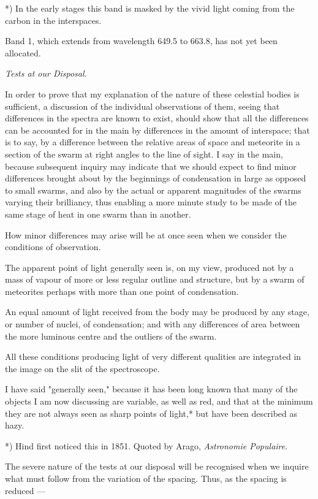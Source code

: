 \documentclass[a4paper, 12pt, oneside, polutonikogreek, english]{article}
\begin{document}
*) In the early stages this band is masked by the vivid light coming from the carbon in the interspaces.

Band 1, which extends from wavelength 649.5 to 663.8, has not yet been allocated.

\emph{Tests at our Disposal.}

In order to prove that my explanation of the nature of these celestial bodies is sufficient, a discussion of the individual observations of them, seeing that differences in the spectra are known to exist, should show that all the differences can be accounted for in the main by differences in the amount of interspace; that is to say, by a difference between the relative areas of space and meteorite in a section of the swarm at right angles to the line of sight. I say in the main, because subsequent inquiry may indicate that we should expect to find minor differences brought about by the beginnings of condensation in large as opposed to small swarms, and also by the actual or apparent magnitudes of the swarms varying their brilliancy, thus enabling a more minute study to be made of the same stage of heat in one swarm than in another.

How minor differences may arise will be at once seen when we consider the conditions of observation.

The apparent point of light generally seen is, on my view, produced not by a mass of vapour of more or less regular outline and structure, but by a swarm of meteorites perhaps with more than one point of condensation.

An equal amount of light received from the body may be produced by any stage, or number of nuclei, of condensation; and with any differences of area between the more luminous centre and the outliers of the swarm.

All these conditions producing light of very different qualities are integrated in the image on the slit of the spectroscope.

I have said "generally seen," because it has been long known that many of the objects I am now discussing are variable, as well as red, and that at the minimum they are not always seen as sharp points of light,* but have been described as hazy.

*) Hind first noticed this in 1851. Quoted by Arago, \emph{Astronomie Populaire}.

The severe nature of the tests at our disposal will be recognised when we inquire what must follow from the variation of the spacing. Thus, as the spacing is reduced ---
\end{document}
